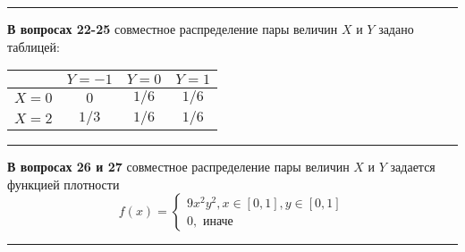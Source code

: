 




















\rule{\textwidth}{1pt}
\textbf{В вопросах 22-25} совместное распределение пары величин $X$ и $Y$ задано таблицей:

\begin{tabular}{c|ccc}
 & $Y=-1$ & $Y=0$ & $Y=1$ \\
\hline
$X=0$ & $0$ & $1/6$  &  $1/6$\\
$X=2$ & $1/3$ & $1/6$ &  $1/6$ \\
\end{tabular}


\vspace{0.2cm}

% 



\rule{\textwidth}{1pt}

\textbf{В вопросах 26 и 27} совместное распределение пары величин $X$ и $Y$ задается функцией плотности
\[
f(x) = \begin{cases}
     				9 x^2 y^2, x \in [0,1], y \in [0,1] \\
     				0,\text{ иначе}
 				\end{cases}
\]
\vspace{0.2cm}




\rule{\textwidth}{1pt}


% 



